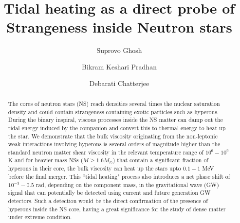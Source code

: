 \documentclass[%
 reprint,
 amsmath,amssymb,
 aps,
]{revtex4-2}
\begin{document}

\title{Tidal heating as a direct probe of Strangeness inside Neutron stars}%

\author{Suprovo Ghosh}
\author{Bikram Keshari Pradhan}
\author{Debarati Chatterjee}%
%


\newcommand{\sg}[1]{\textsf{\color{blue}{ #1}}}
\newcommand{\dc}[1]{\textsf{\color{red}{ #1}}}
\newcommand{\bkp}[1]{\textsf{\color{green}{ #1}}}

\begin{abstract}
The cores of neutron stars (NS) reach densities several times the nuclear saturation density and could contain strangeness containing exotic particles such as hyperons. During the binary inspiral, viscous processes inside the NS matter can damp out the tidal energy induced by the companion and convert this to thermal energy to heat up the star.  We demonstrate that the bulk viscosity originating from the non-leptonic weak interactions involving hyperons is several orders of magnitude higher than the standard neutron matter shear viscosity in the relevant temperature range of $10^6-10^9$K and for heavier mass NSs ($M \geq 1.6M_{\odot}$) that contain a significant fraction of hyperons in their core, the bulk viscosity can heat up the stars upto $0.1 - 1$ MeV before the final merger. This ``tidal heating" process also introduces a net phase shift of $10^{-3}-0.5$ rad, depending on the component mass, in the gravitational wave (GW) signal that can potentially be detected using current and future generation GW detectors. Such a detection would be the direct confirmation of the presence of hyperons inside the NS core, having a great significance for the study of dense matter under extreme condition.

\end{abstract}
\end{document}
